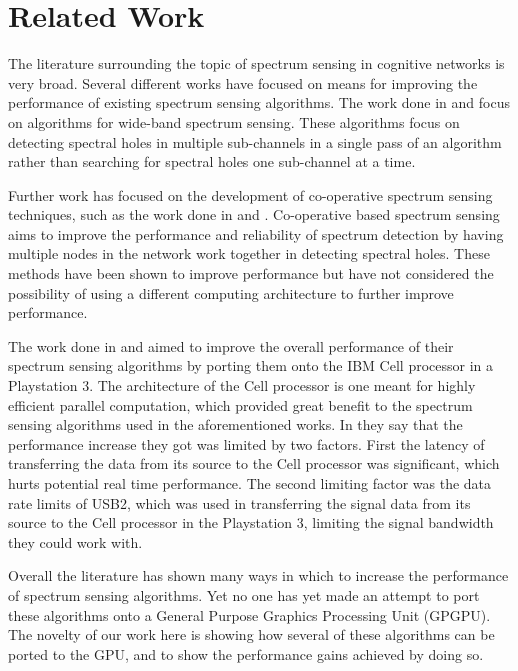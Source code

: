 \section{Related Work}
\label{sect:gpu_related_work}
The literature surrounding the topic of spectrum sensing in cognitive networks is very broad.  Several different works have focused on means for improving the performance of existing spectrum sensing algorithms.  The work done in \cite{HurParWoo06} and \cite{QuaCuiSay08} focus on algorithms for wide-band spectrum sensing.  These algorithms focus on detecting spectral holes in multiple sub-channels in a single pass of an algorithm rather than searching for spectral holes one sub-channel at a time.

Further work has focused on the development of co-operative spectrum sensing techniques, such as the work done in \cite{GanLi05} and \cite{SadAzm08}.  Co-operative based spectrum sensing aims to improve the performance and reliability of spectrum detection by having multiple nodes in the network work together in detecting spectral holes.  These methods have been shown to improve performance but have not considered the possibility of using a different computing architecture to further improve performance.

The work done in \cite{OshClaEbe07} and \cite{FenBos07} aimed to improve the overall performance of their spectrum sensing algorithms by porting them onto the IBM Cell processor in a Playstation 3.  The architecture of the Cell processor is one meant for highly efficient parallel computation, which provided great benefit to the spectrum sensing algorithms used in the aforementioned works.  In \cite{FenBos07} they say that the performance increase they got was limited by two factors.  First the latency of transferring the data from its source to the Cell processor was significant, which hurts potential real time performance.  The second limiting factor was the data rate limits of USB2, which was used in transferring the signal data from its source to the Cell processor in the Playstation 3, limiting the signal bandwidth they could work with.

Overall the literature has shown many ways in which to increase the performance of spectrum sensing algorithms.  Yet no one has yet made an attempt to port these algorithms onto a General Purpose Graphics Processing Unit (GPGPU).  The novelty of our work here is showing how several of these algorithms can be ported to the GPU, and to show the performance gains achieved by doing so.

